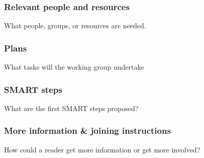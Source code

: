 
\subsubsection{Relevant people and resources}

What people, groups, or resources are needed.

\subsubsection{Plans}

What tasks will the working group undertake

\subsubsection{SMART steps}

What are the first SMART steps proposed?

\subsubsection{More information \& joining instructions}

How could a reader get more information or get more involved?